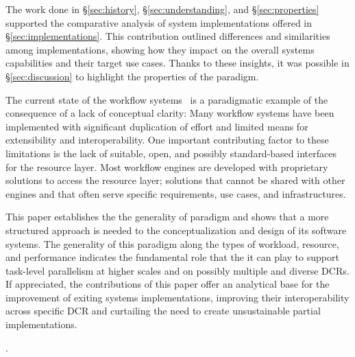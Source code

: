 \documentclass{sig-alternate}
\begin{document}
The work done in \S\ref{sec:history}, \S\ref{sec:understanding}, and
\S\ref{sec:properties} supported the comparative analysis of \pilot system
implementations offered in \S\ref{sec:implementations}. This contribution
outlined differences and similarities among implementations, showing how they
impact on the overall \pilot systems capabilities and their target use cases.
Thanks to these insights, it was possible in \S\ref{sec:discussion} to highlight
the properties of the \pilot paradigm.

  The current state of the workflow
systems~\cite{taylor2014} is a paradigmatic example of the consequence of a lack
of conceptual clarity: Many workflow systems have been implemented with
significant duplication of effort and limited means for extensibility and
interoperability. One important contributing factor to these limitations is the
lack of suitable, open, and possibly standard-based interfaces for the resource
layer. Most workflow engines are developed with proprietary solutions to access
the resource layer; solutions that cannot be shared with other engines and that
often serve specific requirements, use cases, and infrastructures.

This paper establishes the the generality of \pilot paradigm and shows that a
more structured approach is needed to the conceptualization
and design of its software systems.
The generality of this paradigm along the types of workload, resource, and
performance indicates the fundamental role that the it can play to support
task-level parallelism at higher scales and on possibly multiple and diverse
DCRs. If appreciated, the contributions of this paper offer an analytical base
for the improvement of exiting \pilot systems implementations, improving their
interoperability across specific DCR and curtailing the need to create
unsustainable partial implementations.

.
\end{document}
